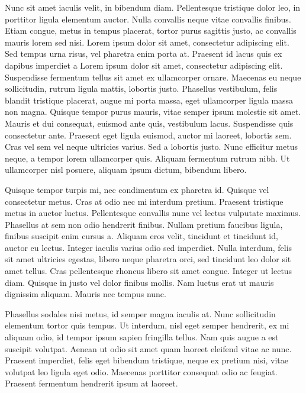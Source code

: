 \documentclass{homework}
\begin{document}
Nunc sit amet iaculis velit, in bibendum diam. Pellentesque tristique dolor leo, in porttitor ligula elementum auctor. Nulla convallis neque vitae convallis finibus. Etiam congue, metus in tempus placerat, tortor purus sagittis justo, ac convallis mauris lorem sed nisi. Lorem ipsum dolor sit amet, consectetur adipiscing elit. Sed tempus urna risus, vel pharetra enim porta at. Praesent id lacus quis ex dapibus imperdiet a
Lorem ipsum dolor sit amet, consectetur adipiscing elit. Suspendisse fermentum tellus sit amet ex ullamcorper ornare. Maecenas eu neque sollicitudin, rutrum ligula mattis, lobortis justo. Phasellus vestibulum, felis blandit tristique placerat, augue mi porta massa, eget ullamcorper ligula massa non magna. Quisque tempor purus mauris, vitae semper ipsum molestie sit amet. Mauris et dui consequat, euismod ante quis, vestibulum lacus. Suspendisse quis consectetur ante. Praesent eget ligula euismod, auctor mi laoreet, lobortis sem. Cras vel sem vel neque ultricies varius. Sed a lobortis justo. Nunc efficitur metus neque, a tempor lorem ullamcorper quis. Aliquam fermentum rutrum nibh. Ut ullamcorper nisl posuere, aliquam ipsum dictum, bibendum libero.

Quisque tempor turpis mi, nec condimentum ex pharetra id. Quisque vel consectetur metus. Cras at odio nec mi interdum pretium. Praesent tristique metus in auctor luctus. Pellentesque convallis nunc vel lectus vulputate maximus. Phasellus at sem non odio hendrerit finibus. Nullam pretium faucibus ligula, finibus suscipit enim cursus a. Aliquam eros velit, tincidunt et tincidunt id, auctor eu lectus. Integer iaculis varius odio sed imperdiet. Nulla interdum, felis sit amet ultricies egestas, libero neque pharetra orci, sed tincidunt leo dolor sit amet tellus. Cras pellentesque rhoncus libero sit amet congue. Integer ut lectus diam. Quisque in justo vel dolor finibus mollis. Nam luctus erat ut mauris dignissim aliquam. Mauris nec tempus nunc.

Phasellus sodales nisi metus, id semper magna iaculis at. Nunc sollicitudin elementum tortor quis tempus. Ut interdum, nisl eget semper hendrerit, ex mi aliquam odio, id tempor ipsum sapien fringilla tellus. Nam quis augue a est suscipit volutpat. Aenean ut odio sit amet quam laoreet eleifend vitae ac nunc. Praesent imperdiet, felis eget bibendum tristique, neque ex pretium nisi, vitae volutpat leo ligula eget odio. Maecenas porttitor consequat odio ac feugiat. Praesent fermentum hendrerit ipsum at laoreet.
\end{document}
